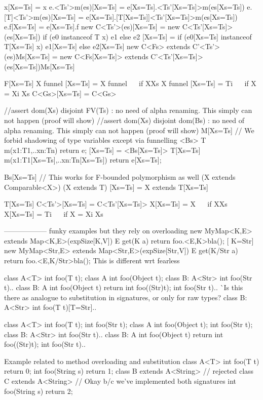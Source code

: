 x[Xs=Ts] = x
e.<Ts'>m(es)[Xs=Ts] = e[Xs=Ts].<Ts'[Xs=Ts]>m(es[Xs=Ts])
e.[T]<Ts'>m(es)[Xs=Ts] = e[Xs=Ts].[T[Xs=Ts]]<Ts'[Xs=Ts]>m(es[Xs=Ts])
e.f[Xs=Ts] = e[Xs=Ts].f
new C<Ts'>(es)[Xs=Ts] = new C<Ts'[Xs=Ts]>(es[Xs=Ts])
if (e0 instanceof T x){ e1 } else { e2 }[Xs=Ts] = if (e0[Xs=Ts] instanceof T[Xs=Ts] x){ e1[Xs=Ts] } else { e2[Xs=Ts] }
new C<Fs> extends C'<Ts'>(es){Ms}[Xs=Ts] = new C<Fs[Xs=Ts]> extends C'<Ts'[Xs=Ts]>(es[Xs=Ts]){Ms[Xs=Ts]}

F[Xs=Ts]
X funnel [Xs=Ts] = X funnel ~~ if X\not\in Xs
X funnel [Xs=Ts] = Ti ~~ if X = Xi \in Xs
C<Gs>[Xs=Ts] = C<Gs>

//assert dom(Xs) disjoint FV(Ts) : no need of alpha renaming. This simply can not happen (proof will show)
//assert dom(Xs) disjoint dom(Bs) : no need of alpha renaming. This simply can not happen (proof will show)
M[Xs=Ts] // We forbid shadowing of type variables except via funnelling
<Bs> T m(x1:T1,..xn:Tn){ return e; }[Xs=Ts] = <Bs[Xs=Ts]> T[Xs=Ts] m(x1:T1[Xs=Ts],..xn:Tn[Xs=Ts]){ return e[Xs=Ts]; }

Bs[Xs=Ts] // This works for F-bounded polymorphism as well (X extends Comparable<X>)
(X extends T) [Xs=Ts] = X extends T[Xs=Ts]

T[Xs=Ts]
C<Ts'>[Xs=Ts] = C<Ts'[Xs=Ts]>
X[Xs=Ts] = X ~~ if X\not\in Xs
X[Xs=Ts] = Ti ~~ if X = Xi \in Xs



------------------
funky examples but they rely on overloading
new MyMap<K,E> extends Map<K,E>(expSize[K,V]){ E get(K a){ return foo.<E,K>bla(); } }[ K=Str]
new MyMap<Str,E> extends Map<Str,E>(expSize[Str,V]){ E get(K/Str a){ return foo.<E,K/Str>bla(); } }
This is different wrt fearless


class A<T>{ int foo(T t); }    class A{ int foo(Object t); }
class B: A<Str>{ int foo(Str t){..} }class B: A{ int foo(Object t){ return int foo((Str)t); } int foo(Str t){..} }
^^ Is this there as analogue to substitution in signatures, or only for raw types?
class B: A<Str>{ int foo(T t)[T=Str]{..} }


class A<T>{ int foo(T t); int foo(Str t); }    class A{ int foo(Object t); int foo(Str t); }
class B: A<Str>{ int foo(Str t){..} }  class B: A{ int foo(Object t){ return int foo((Str)t); } int foo(Str t){..} }


Example related to method overloading and substitution
class A<T> {
    int foo(T t) { return 0; }
    int foo(String s) { return 1; }
}
class B extends A<String> {} // rejected
class C extends A<String> {
    // Okay b/c we've implemented both signatures
    int foo(String s) { return 2; }
}

